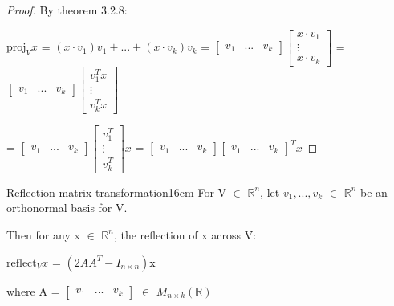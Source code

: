     \begin{proof}
        By {\color{red} theorem 3.2.8}:

        \hspace{0.5cm}
        $\text{proj}_Vx$
        = $(x \cdot v_1)v_1 + ... + (x \cdot v_k)v_k$ =
        \footnotesize
        $\begin{bmatrix}
            v_1 & ... & v_k
        \end{bmatrix}
        \begin{bmatrix}
            x \cdot v_1 \\
            \vdots \\
            x \cdot v_k
        \end{bmatrix}$ =
        $\begin{bmatrix}
            v_1 & ... & v_k
        \end{bmatrix}
        \begin{bmatrix}
            v_1^Tx \\
            \vdots \\
            v_k^Tx
        \end{bmatrix}$
        \normalsize
        
        \hspace{1.9cm}
        =
        \footnotesize
        $\begin{bmatrix}
            v_1 & ... & v_k
        \end{bmatrix}
        \begin{bmatrix}
            v_1^T \\
            \vdots \\
            v_k^T
        \end{bmatrix}x$ =
        $\begin{bmatrix}
            v_1 & ... & v_k
        \end{bmatrix}
        \begin{bmatrix}
            v_1 & ... & v_k
        \end{bmatrix}^Tx$
        \normalsize
    \end{proof}

    \vspace{0.5cm}



    \begin{wtheorem}{Reflection matrix transformation}{16cm}
        For V $\in$ $\mathbb{R}^n$, let $v_1,...,v_k$ $\in$ $\mathbb{R}^n$
        be an orthonormal basis for V.
        
        Then for any x $\in$ $\mathbb{R}^n$,
        the {\color{lblue} reflection} of x across V:

        \hspace{0.5cm}
        $\text{reflect}_Vx$ = $(2AA^T - I_{n \times n})$x  

        where A =
        $\begin{bmatrix}
            v_1 & ... & v_k
        \end{bmatrix}$
        $\in$ $M_{n \times k}(\mathbb{R})$
    \end{wtheorem}

